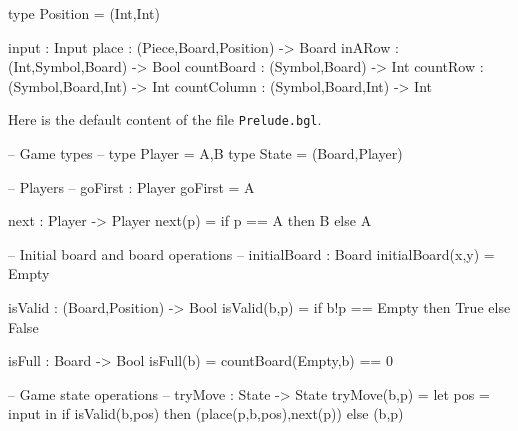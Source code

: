 \documentclass[11pt]{article}
\newcommand{\prog}[1]{\texttt{#1}}
\begin{document}
\begin{program}
type Position = (Int,Int)

input       : Input
place       : (Piece,Board,Position) -> Board
inARow      : (Int,Symbol,Board) -> Bool
countBoard  : (Symbol,Board) -> Int
countRow    : (Symbol,Board,Int) -> Int
countColumn : (Symbol,Board,Int) -> Int
\end{program}
%
Here is the default content of the file \prog{Prelude.bgl}.

\begin{programPageBreak}
-- Game types
--
type Player = {A,B}
type State = (Board,Player)


-- Players
--
goFirst : Player
goFirst = A

next : Player -> Player
next(p) = if p == A then B else A


-- Initial board and board operations
--
initialBoard : Board
initialBoard(x,y) = Empty

isValid : (Board,Position) -> Bool
isValid(b,p) = if b!p == Empty then True else False

isFull : Board -> Bool
isFull(b) = countBoard(Empty,b) == 0


-- Game state operations
--
tryMove : State -> State
tryMove(b,p) = let pos = input in
                   if isValid(b,pos) then (place(p,b,pos),next(p))
                                     else (b,p)
\end{programPageBreak}
\end{document}
